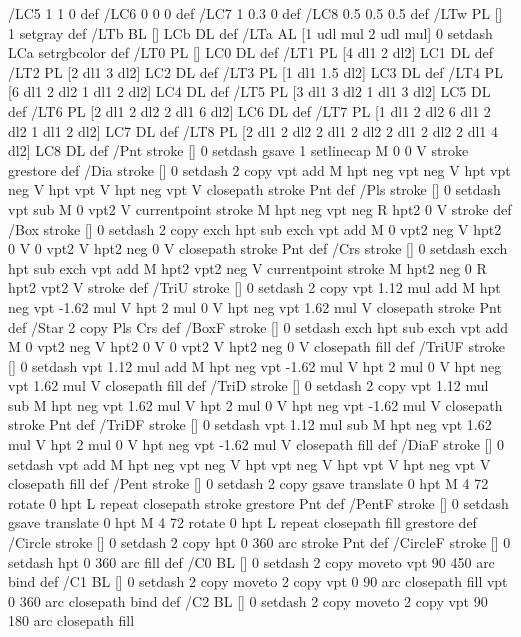 {{/LC5 {1 1 0} def
/LC6 {0 0 0} def
/LC7 {1 0.3 0} def
/LC8 {0.5 0.5 0.5} def
/LTw {PL [] 1 setgray} def
/LTb {BL [] LCb DL} def
/LTa {AL [1 udl mul 2 udl mul] 0 setdash LCa setrgbcolor} def
/LT0 {PL [] LC0 DL} def
/LT1 {PL [4 dl1 2 dl2] LC1 DL} def
/LT2 {PL [2 dl1 3 dl2] LC2 DL} def
/LT3 {PL [1 dl1 1.5 dl2] LC3 DL} def
/LT4 {PL [6 dl1 2 dl2 1 dl1 2 dl2] LC4 DL} def
/LT5 {PL [3 dl1 3 dl2 1 dl1 3 dl2] LC5 DL} def
/LT6 {PL [2 dl1 2 dl2 2 dl1 6 dl2] LC6 DL} def
/LT7 {PL [1 dl1 2 dl2 6 dl1 2 dl2 1 dl1 2 dl2] LC7 DL} def
/LT8 {PL [2 dl1 2 dl2 2 dl1 2 dl2 2 dl1 2 dl2 2 dl1 4 dl2] LC8 DL} def
/Pnt {stroke [] 0 setdash gsave 1 setlinecap M 0 0 V stroke grestore} def
/Dia {stroke [] 0 setdash 2 copy vpt add M
  hpt neg vpt neg V hpt vpt neg V
  hpt vpt V hpt neg vpt V closepath stroke
  Pnt} def
/Pls {stroke [] 0 setdash vpt sub M 0 vpt2 V
  currentpoint stroke M
  hpt neg vpt neg R hpt2 0 V stroke
 } def
/Box {stroke [] 0 setdash 2 copy exch hpt sub exch vpt add M
  0 vpt2 neg V hpt2 0 V 0 vpt2 V
  hpt2 neg 0 V closepath stroke
  Pnt} def
/Crs {stroke [] 0 setdash exch hpt sub exch vpt add M
  hpt2 vpt2 neg V currentpoint stroke M
  hpt2 neg 0 R hpt2 vpt2 V stroke} def
/TriU {stroke [] 0 setdash 2 copy vpt 1.12 mul add M
  hpt neg vpt -1.62 mul V
  hpt 2 mul 0 V
  hpt neg vpt 1.62 mul V closepath stroke
  Pnt} def
/Star {2 copy Pls Crs} def
/BoxF {stroke [] 0 setdash exch hpt sub exch vpt add M
  0 vpt2 neg V hpt2 0 V 0 vpt2 V
  hpt2 neg 0 V closepath fill} def
/TriUF {stroke [] 0 setdash vpt 1.12 mul add M
  hpt neg vpt -1.62 mul V
  hpt 2 mul 0 V
  hpt neg vpt 1.62 mul V closepath fill} def
/TriD {stroke [] 0 setdash 2 copy vpt 1.12 mul sub M
  hpt neg vpt 1.62 mul V
  hpt 2 mul 0 V
  hpt neg vpt -1.62 mul V closepath stroke
  Pnt} def
/TriDF {stroke [] 0 setdash vpt 1.12 mul sub M
  hpt neg vpt 1.62 mul V
  hpt 2 mul 0 V
  hpt neg vpt -1.62 mul V closepath fill} def
/DiaF {stroke [] 0 setdash vpt add M
  hpt neg vpt neg V hpt vpt neg V
  hpt vpt V hpt neg vpt V closepath fill} def
/Pent {stroke [] 0 setdash 2 copy gsave
  translate 0 hpt M 4 {72 rotate 0 hpt L} repeat
  closepath stroke grestore Pnt} def
/PentF {stroke [] 0 setdash gsave
  translate 0 hpt M 4 {72 rotate 0 hpt L} repeat
  closepath fill grestore} def
/Circle {stroke [] 0 setdash 2 copy
  hpt 0 360 arc stroke Pnt} def
/CircleF {stroke [] 0 setdash hpt 0 360 arc fill} def
/C0 {BL [] 0 setdash 2 copy moveto vpt 90 450 arc} bind def
/C1 {BL [] 0 setdash 2 copy moveto
	2 copy vpt 0 90 arc closepath fill
	vpt 0 360 arc closepath} bind def
/C2 {BL [] 0 setdash 2 copy moveto
	2 copy vpt 90 180 arc closepath fill
}}}
